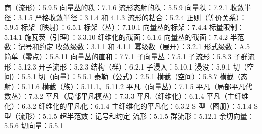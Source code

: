 商（流形）：5.9.5 向量丛的秩：7.1.6 流形态射的秩：5.5.9 向量秩：7.2.1 收敛半径：3.1.5 严格收敛半径：3.1.4 和 4.1.3 流形的粘合：5.2.4 正则（等价关系）：5.9.5 标架（映射）：6.5.1 标架（丛）：7.10.1 向量丛的标架：7.4.4 标量限制：5.14.1 施瓦茨（引理）：3.3.10 纤维化的截面：6.1.6 向量丛的截面：7.4.2 半范数：记号和约定 收敛级数：3.1.1 和 4.1.1 幂级数（展开）：3.2.1 形式级数：A.5 简单（零点）：5.8.11 向量丛的直和：7.7.1 子向量丛：7.5.1 子流形：5.8.3 子群流形：5.12.3 开子流形：5.2.3 结构（群）：6.2.1 子浸入：5.10.1 浸没：5.9.1 切（空间）：5.5.1 切（向量）：5.5.1 泰勒（公式）：2.5.1 横截（空间）：5.8.7 横截（态射）：5.11.6 横截（族）：5.11.1、5.11.2 平凡（向量丛）：7.1.5 平凡（局部平凡代数丛）：7.3.2 平凡（局部平凡模丛）：7.3.3 平凡（纤维化）：6.1.4 平凡（主纤维化）：6.3.2 纤维化的平凡化：6.1.4 主纤维化的平凡化：6.3.2 S 型（图册）：5.1.4 S 型（流形）：5.1.5 超半范数：记号和约定 流形：5.1.5 群流形：5.12.1 余切向量：5.5.6 切向量：5.5.1


